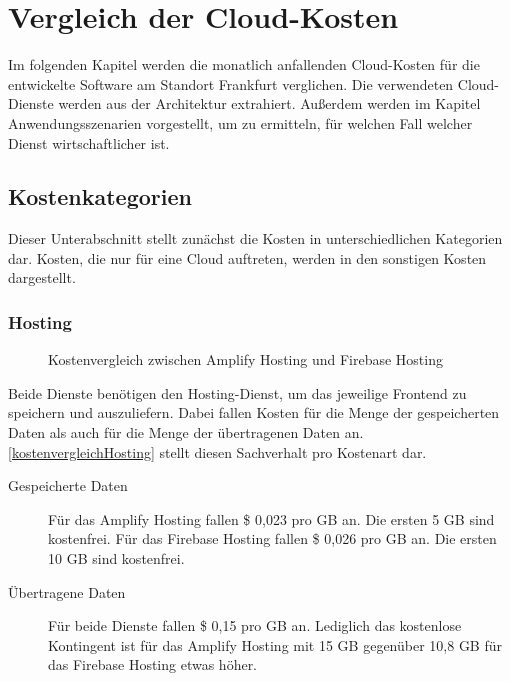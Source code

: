 \chapter{Vergleich der Cloud-Kosten}

Im folgenden Kapitel werden die monatlich anfallenden Cloud-Kosten \autocite{awsPricing} \autocite{gcpPricing} für die entwickelte Software am Standort Frankfurt verglichen. Die verwendeten Cloud-Dienste werden aus der Architektur extrahiert. Außerdem werden im Kapitel Anwendungsszenarien vorgestellt, um zu ermitteln, für welchen Fall welcher Dienst wirtschaftlicher ist.

\section{Kostenkategorien}

Dieser Unterabschnitt stellt zunächst die Kosten in unterschiedlichen Kategorien dar. Kosten, die nur für eine Cloud auftreten, werden in den sonstigen Kosten dargestellt.

\subsection{Hosting}

\begin{figure}%
    \centering
    \qquad
    \caption{Kostenvergleich zwischen Amplify Hosting und Firebase Hosting}%
    \label{kostenvergleichHosting}%
\end{figure}

Beide Dienste benötigen den Hosting-Dienst, um das jeweilige Frontend zu speichern und auszuliefern. Dabei fallen Kosten für die Menge der gespeicherten Daten als auch für die Menge der übertragenen Daten an. \autoref{kostenvergleichHosting} stellt diesen Sachverhalt pro Kostenart dar.

\begin{description}
  \item[Gespeicherte Daten] Für das Amplify Hosting fallen \$ 0,023 pro GB an. Die ersten 5 GB sind kostenfrei. Für das Firebase Hosting fallen \$ 0,026 pro GB an. Die ersten 10 GB sind kostenfrei.
  \item[Übertragene Daten] Für beide Dienste fallen \$ 0,15 pro GB an. Lediglich das kostenlose Kontingent ist für das Amplify Hosting mit 15 GB gegenüber 10,8 GB für das Firebase Hosting etwas höher.
\end{description}


